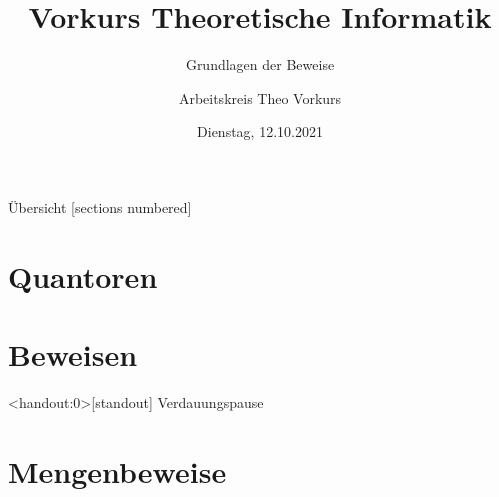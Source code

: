 

\title{Vorkurs Theoretische Informatik}
\subtitle{Grundlagen der Beweise}
\date{Dienstag, 12.10.2021}
\author{Arbeitskreis Theo Vorkurs}



\maketitle

\begin{frame}[fragile]{Übersicht}
  [sections numbered]
  \tableofcontents
\end{frame}

\section{Quantoren}



\section{Beweisen}



\begin{frame}<handout:0>[standout]
	Verdauungspause
\end{frame}










\section{Mengenbeweise}




